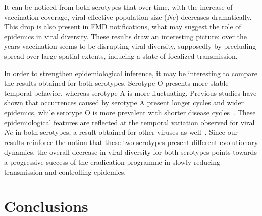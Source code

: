 \documentclass[10pt]{article}
\begin{document}
%
It can be noticed from both serotypes that over time, with the increase of vaccination coverage, viral effective population size ($Ne$) decreases dramatically.
This drop is also present in FMD notifications, what may suggest the role of epidemics in viral diversity.
These results draw an interesting picture: over the years vaccination seems to be disrupting viral diversity, supposedly by precluding spread over large spatial extents, inducing a state of focalized transmission.

In order to strengthen epidemiological inference, it may be interesting to compare the results obtained for both serotypes.
Serotype O presents more stable temporal behavior, whereas serotype A is more fluctuating.
Previous studies have shown that occurrences caused by serotype A present longer cycles and wider epidemics, while serotype O is more prevalent with shorter disease cycles~\cite{colombiatime}.
These epidemiological features are reflected at the temporal variation observed for viral $Ne$ in both serotypes, a result obtained for other viruses as well~\cite{Bennett2010,Pybus2003}. 
Since our results reinforce the notion that these two serotypes present different evolutionary dynamics, the overall decrease in viral diversity for both serotypes points towards a progressive success of the eradication programme in slowly reducing transmission and controlling epidemics.
\section*{Conclusions}
\end{document}

